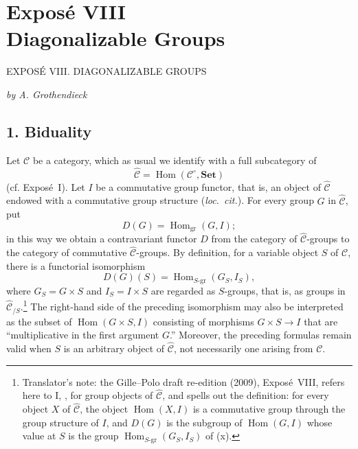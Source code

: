 
\chapter*{Expos\'e VIII\\Diagonalizable Groups}
%
  {EXPOS\'E VIII. DIAGONALIZABLE GROUPS}

\begin{center}
  \textit{by A. Grothendieck}
\end{center}

\section*{1. Biduality}

Let \(\mathscr C\) be a category, which as usual we identify with a full
subcategory of
\[
  \widehat{\mathscr C}
  =\operatorname{Hom}(\mathscr C^{\circ},\mathbf{Set})
\]
(cf. Expos\'e~I). Let \(I\) be a commutative group functor, that is, an
object of \(\widehat{\mathscr C}\) endowed with a commutative group structure
(\emph{loc.\ cit.}). For every group \(G\) in \(\widehat{\mathscr C}\), put
\[
  D(G)=\operatorname{Hom}_{\mathrm{gr}}(G,I);
\]
in this way we obtain a contravariant functor \(D\) from the category of
\(\widehat{\mathscr C}\)-groups to the category of commutative
\(\widehat{\mathscr C}\)-groups. By definition, for a variable object \(S\)
of \(\mathscr C\), there is a functorial isomorphism
\begin{equation}
  \tag{x}
  D(G)(S)=\operatorname{Hom}_{S\text{-}\mathrm{gr}}(G_S,I_S),
\end{equation}
where \(G_S=G\times S\) and \(I_S=I\times S\) are regarded as
\(S\)-groups, that is, as groups in \(\widehat{\mathscr C}_{/S}\).\footnote{Translator's
note: the Gille--Polo draft re-edition (2009), Expos\'e~VIII, refers here to I,
, for group objects of \(\widehat{\mathscr C}\), and spells out the
definition: for every object \(X\) of \(\widehat{\mathscr C}\), the object
\(\operatorname{Hom}(X,I)\) is a commutative group through the group structure of \(I\), and
\(D(G)\) is the subgroup of \(\operatorname{Hom}(G,I)\) whose value at \(S\) is the group
\(\operatorname{Hom}_{S\text{-}\mathrm{gr}}(G_S,I_S)\) of (x).} The
right-hand side of the preceding isomorphism may also be interpreted as the
subset of \(\operatorname{Hom}(G\times S,I)\)
consisting of morphisms \(G\times S\to I\) that are ``multiplicative in the
first argument \(G\).'' Moreover, the preceding formulas remain valid when
\(S\) is an arbitrary object of \(\widehat{\mathscr C}\), not necessarily
one arising from \(\mathscr C\).

